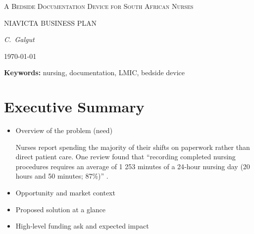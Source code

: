 \documentclass[a4paper,11pt]{article}
\begin{document}
\begin{titlepage}
  \centering
  \vspace*{1cm}
  {\scshape\LARGE A Bedside Documentation Device for South African Nurses\par}
  \vspace{1cm}
  {\scshape\Large NIAVICTA BUSINESS PLAN\par}
  \vfill
  {\Large\itshape C.\ Galgut \par}
  \vspace{2cm}
  {\large \today\par}
\end{titlepage}

\newpage
\begin{abstract}
\end{abstract}

\textbf{Keywords:} nursing, documentation, LMIC, bedside device

\newpage
\tableofcontents
\listoftables
\listoffigures

\newpage
{}

\section{Executive Summary}
\begin{itemize}
  \item Overview of the problem (need)
  
    Nurses report spending the majority of their shifts on paperwork rather than direct patient care. One review found that “recording completed nursing procedures requires an average of 1 253 minutes of a 24‑hour nursing day (20 hours and 50 minutes; 87\%)” \cite{olivierRecordKeepingSelfreported2010}.
    
  \item Opportunity and market context
  \item Proposed solution at a glance
  \item High‑level funding ask and expected impact
\end{itemize}
\end{document}
